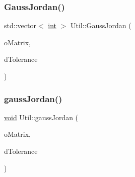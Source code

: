 \subsubsection{\texorpdfstring{Gauss\+Jordan()}{GaussJordan()}}
{\footnotesize\ttfamily std\+::vector$<$ \hyperlink{lp__lib_8h_adeb9ec6400320e4923ac9d836d509ddb}{int} $>$ Util\+::\+Gauss\+Jordan (\begin{DoxyParamCaption}\item[{Double\+Matrix \&}]{o\+Matrix,  }\item[{double}]{d\+Tolerance }\end{DoxyParamCaption})\hspace{0.3cm}{\ttfamily [static]}}

\mbox{\label{class_l_i_b___l_a_1_1_util_a3d6b07b92ce179feee86275b11bf0156}} 
\subsubsection{\texorpdfstring{gauss\+Jordan()}{gaussJordan()}}
{\footnotesize\ttfamily \hyperlink{lp__lib_8h_ac7828c7b2b31d2e11af17bdb6289c5d9}{void} Util\+::gauss\+Jordan (\begin{DoxyParamCaption}\item[{Double\+Matrix \&}]{o\+Matrix,  }\item[{double}]{d\+Tolerance }\end{DoxyParamCaption})\hspace{0.3cm}{\ttfamily [static]}}

\mbox{\label{class_l_i_b___l_a_1_1_util_a0d06eafe51c31b95e461733b06c11d40}} 

